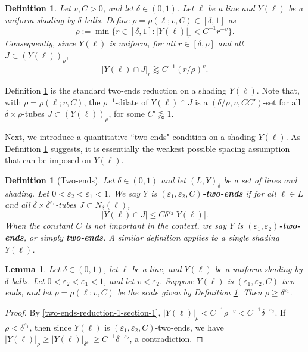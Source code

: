 \documentclass{amsart}
\numberwithin{equation}{section}
\newtheorem{lemma}[theorem]{Lemma}
\newtheorem{definition}[theorem]{Definition}
\newcommand{\de}{\delta}
\newcommand{\e}{\varepsilon}
\begin{document}
\begin{definition}
\label{two-ends-reduction}
Let $v, C>0$, and let $\de\in(0,1)$.
Let $\ell$ be a line and $Y(\ell)$ be a uniform shading by $\de$-balls.
Define $\rho=\rho(\ell;v,C)\in[\de,1]$ as
\begin{equation}
\label{two-ends-reduction-1-section-1}
    \rho:=\min\{r\in[\de,1]:|Y(\ell)|_r< C^{-1}r^{-v}\}.
\end{equation}
Consequently, since $Y(\ell)$ is uniform, for all $r\in[\de,\rho]$ and all $J\subset (Y(\ell))_\rho$, 
\begin{equation}
\label{two-ends-reduction-2-section-1}
    |Y(\ell)\cap J|_r\gtrapprox C^{-1}(r/\rho)^v.
\end{equation}
\end{definition}

Definition \ref{two-ends-reduction} is the standard two-ends reduction on a shading $Y(\ell)$.
Note that, with $\rho=\rho(\ell;v,C)$, 
the $\rho^{-1}$-dilate of $Y(\ell)\cap J$ is a $(\de/\rho,v, CC')$-set for all $\de\times\rho$-tubes $J\subset (Y(\ell))_\rho$, for some $C'\lessapprox1$.

Next, we introduce a quantitative ``two-ends" condition on a shading $Y(\ell)$. 
As Definition \ref{two-ends-reduction} suggests, it is essentially the weakest possible spacing assumption that can be imposed on $Y(\ell)$.

\begin{definition}[Two-ends]
\label{two-ends-def}
Let $\de\in(0,1)$ and let $(L,Y)_\delta$ be a set of lines and shading.
Let $0<\e_2<\e_1<1$.
We say $Y$ is {\bf $(\e_1 ,\e_2, C)$-two-ends} if for all $\ell\in L$ and all $\de\times\de^{\e_1}$-tubes $J\subset N_\de(\ell)$, 
\begin{equation}
    |Y(\ell)\cap J|\leq C\de^{\e_2} |Y(\ell)|.
\end{equation}
When the constant $C$ is not important in the context, we say $Y$ is {\bf $(\e_1 ,\e_2)$-two-ends}, or simply {\bf two-ends}. 
A similar definition applies to a single shading $Y(\ell)$.
\end{definition}


\begin{lemma}
\label{delta-1-rho}
Let $\de\in(0,1)$, let $\ell$ be a line, and $Y(\ell)$ be a uniform shading by $\de$-balls.
Let $0<\e_2<\e_1<1$, and let $v<\e_2$.
Suppose $Y(\ell)$ is $(\e_1,\e_2, C)$-two-ends, and let $\rho=\rho(\ell;v,C)$ be the scale given by Definition \ref{two-ends-reduction}.
Then $\rho\geq \de^{\e_1}$.
\end{lemma}
\begin{proof}
By \eqref{two-ends-reduction-1-section-1}, $|Y(\ell)|_{\rho}< C^{-1}\rho^{-v}< C^{-1}\de^{-\e_2}$.
If $\rho < \delta^{\e_1}$, then since $Y(\ell)$ is $(\e_1,\e_2, C)$-two-ends, we have $|Y(\ell)|_{\rho}\geq |Y(\ell)|_{\de^{\e_1}}\geq C^{-1}\de^{-\e_2}$, a contradiction.
\end{proof}
\end{document}
